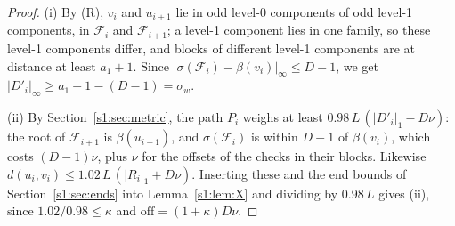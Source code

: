 \documentclass[11pt]{amsart}
\theoremstyle{definition}
\theoremstyle{remark}
\numberwithin{equation}{section}
\newcommand{\cF}{\mathcal{F}}
\begin{document}
\begin{proof}
(i) By (R), $v_i$ and $u_{i+1}$ lie in odd level-0 components of odd level-1 components, in $\cF_i$ and $\cF_{i+1}$; a level-1 component lies in one family, so these level-1 components differ, and blocks of different level-1 components are at distance at least $a_1+1$. Since $|\sigma(\cF_i)-\beta(v_i)|_\infty\le D-1$, we get $|D'_i|_\infty\ge a_1+1-(D-1)=\sigma_w$.

(ii) By Section~\ref{s1:sec:metric}, the path $P_i$ weighs at least $0.98\,L\,(|D'_i|_1-D\nu)$: the root of $\cF_{i+1}$ is $\beta(u_{i+1})$, and $\sigma(\cF_i)$ is within $D-1$ of $\beta(v_i)$, which costs $(D-1)\nu$, plus $\nu$ for the offsets of the checks in their blocks. Likewise $d(u_i,v_i)\le1.02\,L\,(|R_i|_1+D\nu)$. Inserting these and the end bounds of Section~\ref{s1:sec:ends} into Lemma~\ref{s1:lem:X} and dividing by $0.98\,L$ gives (ii), since $1.02/0.98\le\kappa$ and $\mathrm{off}=(1+\kappa)D\nu$.


\end{proof}
\end{document}
